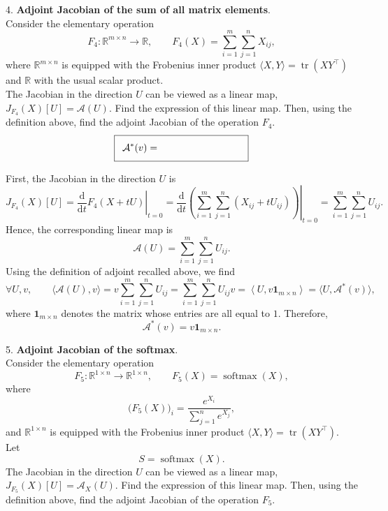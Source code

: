 \documentclass{article}
\theoremstyle{definition}
\theoremstyle{remark}
\begin{document}
4. \textbf{Adjoint Jacobian of the sum of all matrix elements}. \vspace{0.2cm}\\
Consider the elementary operation
\[
F_4: \mathbb{R}^{m \times n} \rightarrow \mathbb{R},
\qquad
F_4(X) = \sum_{i=1}^{m}\sum_{j=1}^{n} X_{ij},
\]
where $\mathbb{R}^{m \times n}$ is equipped with the Frobenius inner product
$\langle X, Y\rangle = \operatorname{tr}(XY^\top)$ and $\mathbb{R}$ with the
usual scalar product.
\vspace{0.2cm}\\
The Jacobian in the direction $U$ can be viewed as a linear map,
$J_{F_4}(X)[U] = \mathcal{A}(U)$. Find the expression of this linear map.
Then, using the definition above, find the adjoint Jacobian of the operation $F_4$.
\vspace{0.2cm}\\
\[
\setlength{\fboxsep}{8pt}
\fbox{$\displaystyle \mathcal{A}^*(v) = \hspace{3cm}$}
\]
\begin{solution}
First, the Jacobian in the direction $U$ is
\[
    J_{F_4}(X)[U]
    =
    \left.\frac{\mathrm{d}}{\mathrm{d}t}
    F_4(X+tU)\right|_{t=0}
    =
    \left.\frac{\mathrm{d}}{\mathrm{d}t}
    \left(
    \sum_{i=1}^{m}\sum_{j=1}^{n}(X_{ij}+tU_{ij})
    \right)\right|_{t=0}
    =
    \sum_{i=1}^{m}\sum_{j=1}^{n}U_{ij}.
\]
Hence, the corresponding linear map is
\[
    \mathcal{A}(U)
    =
    \sum_{i=1}^{m}\sum_{j=1}^{n}U_{ij}.
\]
Using the definition of adjoint recalled above, we find
\[
    \forall U, v, \qquad
    \langle \mathcal{A}(U), v \rangle
    =
    v \sum_{i=1}^{m}\sum_{j=1}^{n} U_{ij}
    =
    \sum_{i=1}^{m}\sum_{j=1}^{n} U_{ij} v
    =
    \left\langle U, v\mathbf{1}_{m\times n} \right\rangle
    =
    \langle U, \mathcal{A}^*(v) \rangle,
\]
where $\mathbf{1}_{m\times n}$ denotes the matrix whose entries are all equal to $1$.
Therefore,
\[
    \mathcal{A}^*(v)
    =
    v\mathbf{1}_{m\times n}.
\]
\end{solution}

5. \textbf{Adjoint Jacobian of the softmax}. \vspace{0.2cm}\\
Consider the elementary operation
    \[
    F_5: \mathbb{R}^{1 \times n} \rightarrow \mathbb{R}^{1 \times n},
    \qquad
    F_5(X) = \operatorname{softmax}(X),
    \]
    where
    \[
    \bigl(F_5(X)\bigr)_i
    =
    \frac{e^{X_i}}{\sum_{j=1}^n e^{X_j}},
    \]
    and $\mathbb{R}^{1 \times n}$ is equipped with the Frobenius inner product
    $\langle X,Y\rangle=\operatorname{tr}(XY^\top)$.
    \vspace{0.2cm}\\
    Let
    \[
    S=\operatorname{softmax}(X).
    \]
    The Jacobian in the direction $U$ can be viewed as a linear map,
    $J_{F_5}(X)[U]=\mathcal{A}_X(U)$.
    Find the expression of this linear map.
    Then, using the definition above, find the adjoint Jacobian of the operation
    $F_5$.
    \vspace{0.2cm}\\
    
\end{document}

